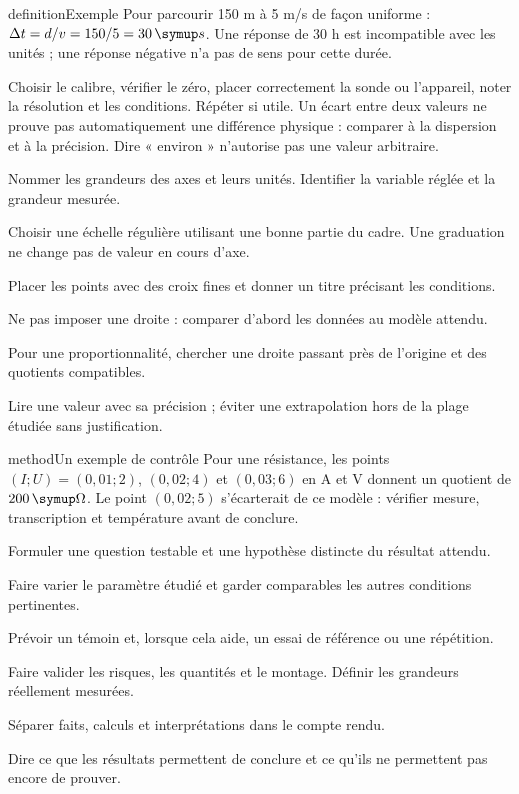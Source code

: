 \begin{pcEncadre}{definition}{Exemple}
Pour parcourir 150 m à 5 m/s de façon uniforme : $\Delta t=d/v=150/5=30\unite s$. Une réponse de 30 h est incompatible avec les unités ; une réponse négative n’a pas de sens pour cette durée.
\end{pcEncadre}
Choisir le calibre, vérifier le zéro, placer correctement la sonde ou l’appareil, noter la résolution et les conditions. Répéter si utile. Un écart entre deux valeurs ne prouve pas automatiquement une différence physique : comparer à la dispersion et à la précision. Dire « environ » n’autorise pas une valeur arbitraire.
\begin{questions}
\item Nommer les grandeurs des axes et leurs unités. Identifier la variable réglée et la grandeur mesurée.
\item Choisir une échelle régulière utilisant une bonne partie du cadre. Une graduation ne change pas de valeur en cours d’axe.
\item Placer les points avec des croix fines et donner un titre précisant les conditions.
\item Ne pas imposer une droite : comparer d’abord les données au modèle attendu.
\item Pour une proportionnalité, chercher une droite passant près de l’origine et des quotients compatibles.
\item Lire une valeur avec sa précision ; éviter une extrapolation hors de la plage étudiée sans justification.
\end{questions}
\begin{pcEncadre}{method}{Un exemple de contrôle}
Pour une résistance, les points $(I;U)=(0{,}01;2)$, $(0{,}02;4)$ et $(0{,}03;6)$ en A et V donnent un quotient de $200\unite\Omega$. Le point $(0{,}02;5)$ s’écarterait de ce modèle : vérifier mesure, transcription et température avant de conclure.
\end{pcEncadre}
\begin{questions}
\item Formuler une question testable et une hypothèse distincte du résultat attendu.
\item Faire varier le paramètre étudié et garder comparables les autres conditions pertinentes.
\item Prévoir un témoin et, lorsque cela aide, un essai de référence ou une répétition.
\item Faire valider les risques, les quantités et le montage. Définir les grandeurs réellement mesurées.
\item Séparer faits, calculs et interprétations dans le compte rendu.
\item Dire ce que les résultats permettent de conclure et ce qu’ils ne permettent pas encore de prouver.
\end{questions}
